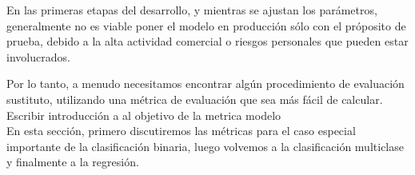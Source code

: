 {En las primeras etapas del desarrollo, y mientras se ajustan los parámetros, generalmente no es viable
 poner el modelo en producción sólo con el próposito de prueba, debido a la alta actividad comercial
o riesgos personales que pueden estar involucrados. 

Por lo tanto, a menudo necesitamos encontrar algún procedimiento de evaluación sustituto, utilizando una métrica de evaluación que sea más fácil de calcular. \\

Escribir introducción a al objetivo de la metrica modelo\\



En esta sección, primero discutiremos las métricas para el caso especial importante de la
clasificación  binaria, luego volvemos  a la clasificación multiclase y finalmente a la  regresión.

}
